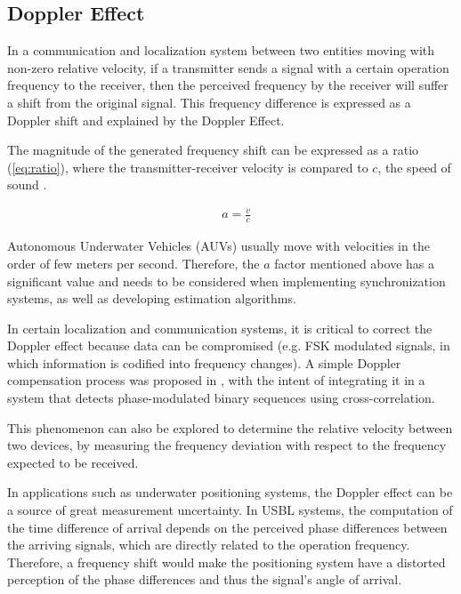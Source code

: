 \subsection{Doppler Effect} \label{subsec:doppler}

In a communication and localization system between two entities moving with non-zero relative velocity, if a transmitter sends a signal with a certain operation frequency to the receiver, then the perceived frequency by the receiver will suffer a shift from the original signal. This frequency difference is expressed as a Doppler shift and explained by the Doppler Effect.

The magnitude of the generated frequency shift can be expressed as a ratio (\ref{eq:ratio}), where the transmitter-receiver velocity is compared to \(c\), the speed of sound \cite{commchan}.

\begin{eqnarray}
&a = \frac{v}{c}
\label{eq:ratio}
\end{eqnarray}

Autonomous Underwater Vehicles (AUVs) usually move with velocities in the order of few meters per second. Therefore, the \(a\) factor mentioned above has a significant value and needs to be considered when implementing synchronization systems, as well as developing estimation algorithms.

In certain localization and communication systems, it is critical to correct the Doppler effect because data can be compromised (e.g. FSK modulated signals, in which information is codified into frequency changes). A simple Doppler compensation process was proposed in \cite{thesis-joao}, with the intent of integrating it in a system that detects phase-modulated binary sequences using cross-correlation.

This phenomenon can also be explored to determine the relative velocity between two devices, by measuring the frequency deviation with respect to the frequency expected to be received.

In applications such as underwater positioning systems, the Doppler effect can be a source of great measurement uncertainty. In USBL systems, the computation of the time difference of arrival depends on the perceived phase differences between the arriving signals, which are directly related to the operation frequency.  Therefore, a frequency shift would make the positioning system have a distorted perception of the phase differences and thus the signal's angle of arrival.

